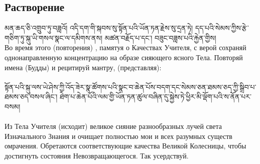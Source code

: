 \subsection{Растворение}
\scriptsize
\ti
མན་ཆད་ཅི་འགྲུབ་ཏུ་བཟླའོ། འདི་དག་གི་སྐབས་སུ་སྟོན་པའི་ཡོན་ཏན་རྗེས་སུ་དྲན་ཏེ། དད་པའི་སེམས་ཀྱིས་རྩེ་གཅིག་ཏུ་སྐུ་ཡི་གསལ་སྣང་ལ་དམིགས་ནས། མཚན་བརྗོད་པ་དང་། བཟུང་བཟླས་པའི་རྐྱེན་གྱིས།\\
\ru
Во время этого (повторения) , памятуя о Качествах Учителя, с верой сохраняй
однонаправленную концентрацию на образе сияющего ясного Тела.
Повторяй имена (Будды) и рецитируй мантру, (представляя):\\
\\
\normalsize
\ti
སྟོན་པའི་སྐུ་ལས་ཡེ་ཤེས་ཀྱི་འོད་ཟེར་སྣ་ཚོགས་པའི་སྣང་བ་ཆེན་པོས་བདག་དང་སེམས་ཅན་ཐམས་ཅད་ཀྱི་སྒྲིབ་པ་ཐམས་ཅད་བསལ་ཞིང་།
ཐེག་པ་ཆེན་པོའི་ལམ་གྱི་ཡོན་ཏན་ཚུལ་བཞིན་དུ་སྐྱེས་ཏེ་ཕྱིར་མི་ལྡོག་པའི་ས་ནོན་པར་བསམ།\\
\\
\ru
Из Тела Учителя (исходит) великое сияние разнообразных лучей света Изначального
Знания и очищает полностью мои и всех разумных существ омрачения. Обретаются
соответствующие качества Великой Колесницы, чтобы достигнуть состояния Невозвращающегося.
Так усердствуй.\\
\\
\scriptsize
\ti
